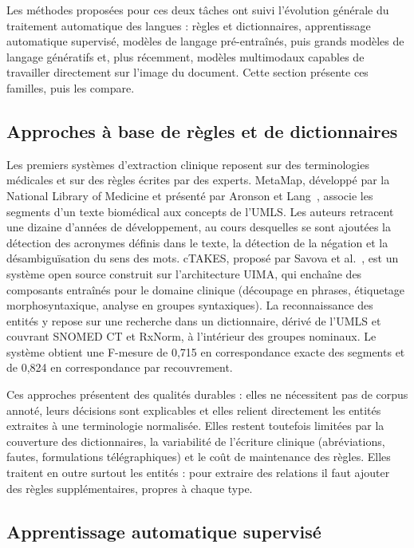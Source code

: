 Les méthodes proposées pour ces deux tâches ont suivi l'évolution générale du traitement automatique des langues : règles et dictionnaires, apprentissage automatique supervisé, modèles de langage pré-entraînés, puis grands modèles de langage génératifs et, plus récemment, modèles multimodaux capables de travailler directement sur l'image du document. Cette section présente ces familles, puis les compare.

\subsection{Approches à base de règles et de dictionnaires}

Les premiers systèmes d'extraction clinique reposent sur des terminologies médicales et sur des règles écrites par des experts. MetaMap, développé par la National Library of Medicine et présenté par Aronson et Lang~\cite{aronson2010metamap}, associe les segments d'un texte biomédical aux concepts de l'UMLS. Les auteurs retracent une dizaine d'années de développement, au cours desquelles se sont ajoutées la détection des acronymes définis dans le texte, la détection de la négation et la désambiguïsation du sens des mots. cTAKES, proposé par Savova et al.~\cite{savova2010ctakes}, est un système open source construit sur l'architecture UIMA, qui enchaîne des composants entraînés pour le domaine clinique (découpage en phrases, étiquetage morphosyntaxique, analyse en groupes syntaxiques). La reconnaissance des entités y repose sur une recherche dans un dictionnaire, dérivé de l'UMLS et couvrant SNOMED CT et RxNorm, à l'intérieur des groupes nominaux. Le système obtient une F-mesure de 0,715 en correspondance exacte des segments et de 0,824 en correspondance par recouvrement.

Ces approches présentent des qualités durables : elles ne nécessitent pas de corpus annoté, leurs décisions sont explicables et elles relient directement les entités extraites à une terminologie normalisée. Elles restent toutefois limitées par la couverture des dictionnaires, la variabilité de l'écriture clinique (abréviations, fautes, formulations télégraphiques) et le coût de maintenance des règles. Elles traitent en outre surtout les entités : pour extraire des relations il faut ajouter des règles supplémentaires, propres à chaque type.

\subsection{Apprentissage automatique supervisé}

